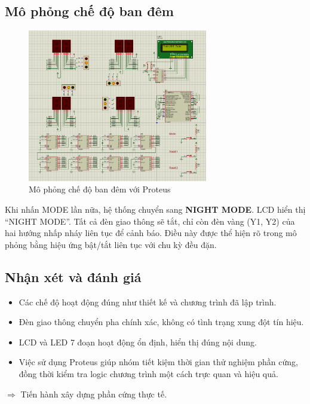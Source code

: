\subsection{Mô phỏng chế độ ban đêm}
\begin{figure}[H]
    \centering
    \includegraphics[width=0.7\textwidth]{pictures/nightproteus.png}
    \caption{Mô phỏng chế độ ban đêm với Proteus}
\end{figure}
Khi nhấn MODE lần nữa, hệ thống chuyển sang \textbf{NIGHT MODE}. LCD hiển thị “NIGHT MODE”. Tất cả đèn giao thông sẽ tắt, chỉ còn đèn vàng (Y1, Y2) của hai hướng nhấp nháy liên tục để cảnh báo. Điều này được thể hiện rõ trong mô phỏng bằng hiệu ứng bật/tắt liên tục với chu kỳ đều đặn.
\subsection{Nhận xét và đánh giá}
\begin{itemize}
    \item Các chế độ hoạt động đúng như thiết kế và chương trình đã lập trình.
    \item Đèn giao thông chuyển pha chính xác, không có tình trạng xung đột tín hiệu.
    \item LCD và LED 7 đoạn hoạt động ổn định, hiển thị đúng nội dung.
    \item Việc sử dụng Proteus giúp nhóm tiết kiệm thời gian thử nghiệm phần cứng, đồng thời kiểm tra logic chương trình một cách trực quan và hiệu quả.
\end{itemize}
$\Rightarrow$ Tiến hành xây dựng phần cứng thực tế.
\cleardoublepage